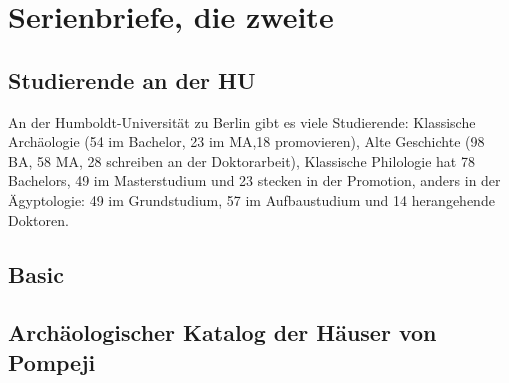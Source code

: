
\chapter{Serienbriefe, die zweite}

\section{Studierende an der HU}

An der Humboldt-Universität zu Berlin gibt es viele Studierende:
Klassische Archäologie (54 im Bachelor, 23 im MA,18 promovieren), 
Alte Geschichte (98 BA, 58 MA, 28 schreiben an der Doktorarbeit),
Klassische Philologie hat 78 Bachelors, 49 im Masterstudium und 23 stecken in der Promotion,
anders in der Ägyptologie: 49 im Grundstudium, 57 im Aufbaustudium und 14 herangehende Doktoren.

\section{Basic}


\section{Archäologischer Katalog der Häuser von Pompeji}



